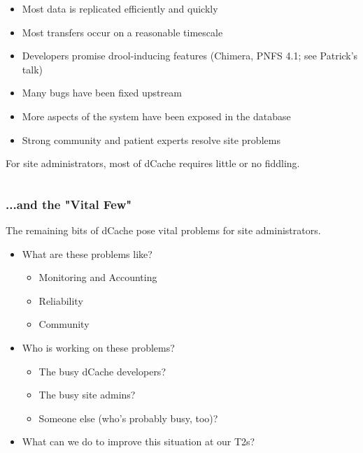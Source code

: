 \documentclass{beamer}
\begin{document}
\begin{frame}
\begin{columns}[t]
\begin{column}{.75\textwidth}
    \begin{itemize}
        \item Most data is replicated efficiently and quickly
        \item Most transfers occur on a reasonable timescale
        \item Developers promise drool-inducing features (Chimera, PNFS 4.1; 
        see Patrick's talk)
        \item Many bugs have been fixed upstream
        \item More aspects of the system have been exposed in the database
        \item Strong community and patient experts resolve site problems
    \end{itemize}
    For site administrators, most of dCache requires little or no fiddling.
\end{column}
\end{columns}
\end{frame}

\begin{frame}
\frametitle{...and the "Vital Few"}
The remaining bits of dCache pose vital problems for site administrators.

\begin{itemize}
    \item What are these problems like?
    \begin{itemize}
        \item Monitoring and Accounting
        \item Reliability
        \item Community
    \end{itemize}
    \item Who is working on these problems?
    \begin{itemize}
        \item The busy dCache developers?
        \item The busy site admins?
        \item Someone else (who's probably busy, too)?
    \end{itemize}
    \item What can we do to improve this situation at our T2s?
\end{itemize}
\end{frame}

\begin{frame}
\tableofcontents
\end{frame}
\end{document}
